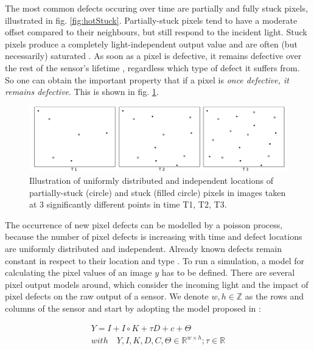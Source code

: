 \documentclass[10pt,twocolumn,letterpaper]{article}
\begin{document}
The most common defects occuring over time are partially and fully stuck pixels, illustrated in fig. \ref{fig:hotStuck}. Partially-stuck pixels tend to have a moderate offset compared to their neighbours, but still respond to the incident light. Stuck pixels produce a completely light-independent output value and are often (but necessarily) saturated \cite{fridrich}. As soon as a pixel is defective, it remains defective over the rest of the sensor's lifetime \cite{failureSemi}, regardless which type of defect it suffers from. So one can obtain the important property that if a pixel is \emph{once defective, it remains defective}. This is shown in fig. \ref{fig:defectLocations}.

\begin{figure}
\centering
\includegraphics[width=\linewidth]{img/defectLocations.png}
\caption{Illustration of uniformly distributed and independent locations of partially-stuck (circle) and stuck (filled circle) pixels in images taken at 3 significantly different points in time T1, T2, T3.}
\label{fig:defectLocations}
\end{figure}

The occurrence of new pixel defects can be modelled by a poisson process, because the number of pixel defects is increasing with time and defect locations are uniformly distributed and independent. Already known defects remain constant in respect to their location and type \cite{fridrich, defectIdentification}. 
To run a simulation, a model for calculating the pixel values of an image $y$ has to be defined. There are several pixel output models around, which consider the incoming light and the impact of pixel defects on the raw output of a sensor. We denote $w,h \in \mathbb{Z}$ as the rows and columns of the sensor and start by adopting the model proposed in \cite{fridrich}:

\begin{equation}
\begin{aligned}
 Y = I+I \circ K+\tau D +c+\Theta \\ with \quad Y,I,K,D,C, \Theta \in \mathbb{R}^{w \times h}; \tau \in \mathbb{R}
\end{aligned}
  \label{equ:pixelmodel}
 \end{equation}
\end{document}
